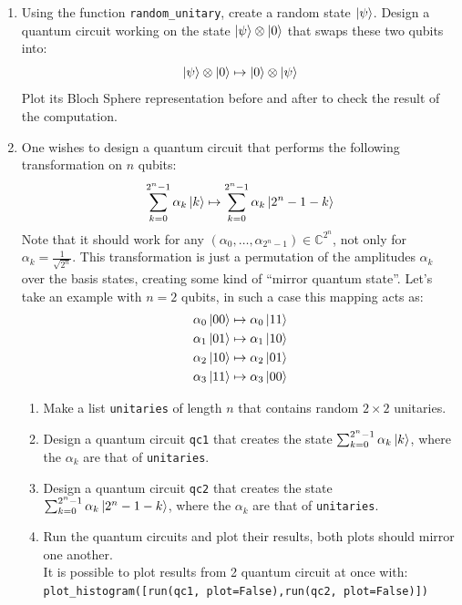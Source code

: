\documentclass{article}
\begin{document}
\begin{enumerate}
    \item Using the function \verb|random_unitary|, create a random state $\ket{\psi}$. Design a quantum circuit working on the state $\ket{\psi}\otimes\ket{0}$ that swaps these two qubits into:
    \begin{equation*}
        \ket{\psi}\otimes\ket{0} \mapsto \ket{0}\otimes\ket{\psi}
    \end{equation*}
    Plot its Bloch Sphere representation before and after to check the result of the computation.
    \item One wishes to design a quantum circuit that performs the following transformation on $n$ qubits:
    \begin{equation*}
        \sum_{k=0}^{2^n-1}\alpha_k\ket{k} \mapsto \sum_{k=0}^{2^n-1}\alpha_k\ket{2^n-1-k}
    \end{equation*}
    Note that it should work for any $(\alpha_0,\dots,\alpha_{2^n-1})\in \mathbb{C}^{2^n}$, not only for $\alpha_k=\frac{1}{\sqrt{2^n}}$. This transformation is just a permutation of the amplitudes $\alpha_k$ over the basis states, creating some kind of “mirror quantum state”. Let's take an example with $n=2$ qubits, in such a case this mapping acts as:
    \begin{equation*}
        \begin{split}
            \alpha_0\ket{00} &\mapsto \alpha_0\ket{11} \\
            \alpha_1\ket{01} &\mapsto \alpha_1\ket{10} \\
            \alpha_2\ket{10} &\mapsto \alpha_2\ket{01} \\
            \alpha_3\ket{11} &\mapsto \alpha_3\ket{00}
        \end{split}
    \end{equation*}
    \begin{enumerate}
        \item Make a list \verb|unitaries| of length $n$ that contains random $2\times 2$ unitaries.
        \item Design a quantum circuit \verb|qc1| that creates the state $\sum_{k=0}^{2^n-1}\alpha_k\ket{k}$, where the $\alpha_k$ are that of \verb|unitaries|.
        \item Design a quantum circuit \verb|qc2| that creates the state $\sum_{k=0}^{2^n-1}\alpha_k\ket{2^n-1-k}$, where the $\alpha_k$ are that of \verb|unitaries|.
        \item Run the quantum circuits and plot their results, both plots should mirror one another.\\ It is possible to plot results from 2 quantum circuit at once with:\\ \verb|plot_histogram([run(qc1, plot=False),run(qc2, plot=False)])|

\end{enumerate}
\end{enumerate}
\end{document}
